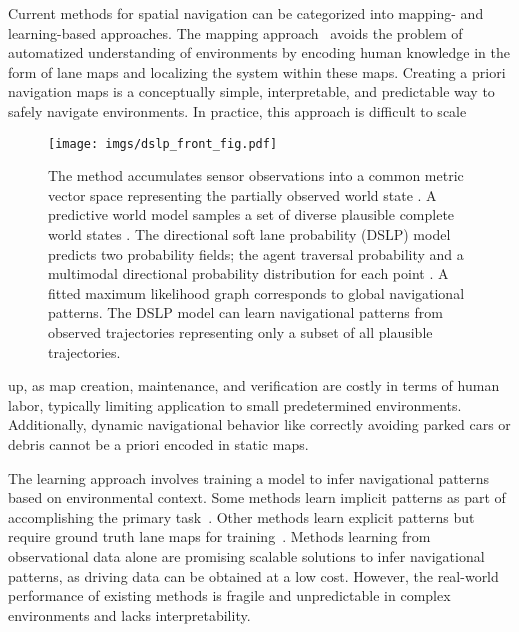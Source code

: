 \documentclass[letterpaper, 10 pt, conference]{ieeeconf}
\begin{document}
Current methods for spatial navigation can be categorized into mapping- and learning-based approaches. The mapping approach~\cite{sheif2016hdmaps} avoids the problem of automatized understanding of environments by encoding human knowledge in the form of lane maps and localizing the system within these maps.
Creating a priori navigation maps is a conceptually simple, interpretable, and predictable way to safely navigate environments.
In practice, this approach is difficult to scale


\begin{figure}[H]
\centering
\texttt{[image: imgs/dslp\_front\_fig.pdf]}
\vspace{-8mm}
\caption{The method accumulates sensor observations into a common metric vector space representing the partially observed world state . A predictive world model samples a set of diverse plausible complete world states . The directional soft lane probability (DSLP) model predicts two probability fields; the agent traversal probability  and a multimodal directional probability distribution  for each point . A fitted maximum likelihood graph corresponds to global navigational patterns. The DSLP model can learn navigational patterns from observed trajectories representing only a subset of all plausible trajectories.}
\label{fig:front_figure}
\vspace{-3mm}
\end{figure}

\noindent up, as map creation, maintenance, and verification are costly in terms of human labor, typically limiting application to small predetermined environments. Additionally, dynamic navigational behavior like correctly avoiding parked cars or debris cannot be a priori encoded in static maps.

The learning approach involves training a model to infer navigational patterns based on environmental context. Some methods learn implicit patterns as part of accomplishing the primary task~\cite{bojarski2016e2e_self_driving, amin2018variational_end2end, bansal2018}. Other methods learn explicit patterns but require ground truth lane maps for training~\cite{zurn2021lanegraphnet, can2021stsu}.
Methods learning from observational data alone are promising scalable solutions to infer navigational patterns, as driving data can be obtained at a low cost.
However, the real-world performance of existing methods is fragile and unpredictable in complex environments and lacks interpretability.
\end{document}
